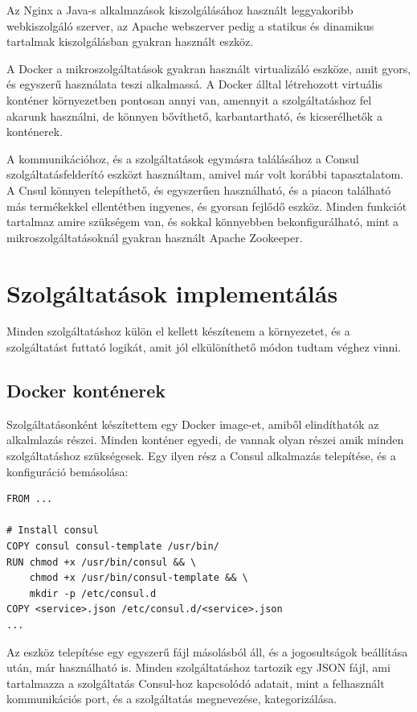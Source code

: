 \documentclass[11pt,magyar,a4paper,twoside,]{report}
\begin{document}
Az Nginx a Java-s alkalmazások kiszolgálásához használt leggyakoribb
webkiszolgáló szerver, az Apache webszerver pedig a statikus és
dinamikus tartalmak kiszolgálásban gyakran használt eszköz.

A Docker a mikroszolgáltatások gyakran használt virtualizáló eszköze,
amit gyors, és egyszerű használata teszi alkalmassá. A Docker álltal
létrehozott virtuális konténer környezetben pontosan annyi van, amennyit
a szolgáltatáshoz fel akarunk használni, de könnyen bővíthető,
karbantartható, és kicserélhetők a konténerek.

A kommunikációhoz, és a szolgáltatások egymásra találásához a Consul
szolgáltatásfelderító eszközt használtam, amivel már volt korábbi
tapasztalatom. A Cnsul könnyen telepíthető, és egyszerűen használható,
és a piacon található más termékekkel ellentétben ingyenes, és gyorsan
fejlődő eszköz. Minden funkciót tartalmaz amire szükségem van, és sokkal
könnyebben bekonfigurálható, mint a mikroszolgáltatásoknál gyakran
használt Apache Zookeeper.

\section{Szolgáltatások
implementálás}\label{szolguxe1ltatuxe1sok-implementuxe1luxe1s}

Minden szolgáltatáshoz külön el kellett készítenem a környezetet, és a
szolgáltatást futtató logikát, amit jól elkülöníthető módon tudtam
véghez vinni.

\subsection{Docker konténerek}\label{docker-kontuxe9nerek}

Szolgáltatásonként készítettem egy Docker image-et, amiből elindíthatók
az alkalmlazás részei. Minden konténer egyedi, de vannak olyan részei
amik minden szolgáltatáshoz szükségesek. Egy ilyen rész a Consul
alkalmazás telepítése, és a konfiguráció bemásolása:

\begin{verbatim}
FROM ...

# Install consul
COPY consul consul-template /usr/bin/
RUN chmod +x /usr/bin/consul && \
    chmod +x /usr/bin/consul-template && \
    mkdir -p /etc/consul.d
COPY <service>.json /etc/consul.d/<service>.json
...
\end{verbatim}

Az eszköz telepítése egy egyszerű fájl másolásból áll, és a
jogosultságok beállítása után, már használható is. Minden
szolgáltatáshoz tartozik egy JSON fájl, ami tartalmazza a szolgáltatás
Consul-hoz kapcsolódó adatait, mint a felhasznált kommunikációs port, és
a szolgáltatás megnevezése, kategorizálása.
\end{document}
